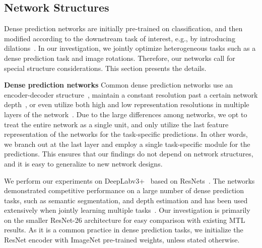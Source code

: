 \documentclass[10pt,twocolumn,letterpaper]{article}
\newcommand{\parsection}[1]{\vspace{1mm}\noindent\textbf{#1 }}
\begin{document}
\subsection{Network Structures}
\label{architecture}

Dense prediction networks are initially pre-trained on classification, and then modified according to the downstream task of interest, e.g., by introducing dilations~\cite{yu2015multi}. 
In our investigation, we jointly optimize heterogeneous tasks such as a dense prediction task and image rotations. 
Therefore, our networks call for special structure considerations. 
This section presents the details.

\parsection{Dense prediction networks}
Common dense prediction networks use an encoder-decoder structure~\cite{ronneberger2015u,badrinarayanan2017segnet}, maintain a constant resolution past a certain network depth~\cite{yu2017dilated}, or even utilize both high and low representation resolutions in multiple layers of the network~\cite{wang2020deep}. 
Due to the large differences among networks, we opt to treat the entire network as a single unit, and only utilize the last feature representation of the networks for the task-specific predictions. 
In other words, we branch out at the last layer and employ a single task-specific module for the predictions.
This ensures that our findings do not depend on network structures, and it is easy to generalize to new network designs.

We perform our experiments on DeepLabv3+~\cite{chen2018encoder} based on ResNets~\cite{he2016deep}. The networks demonstrated competitive performance on a large number of dense prediction tasks, such as semantic segmentation, and depth estimation and has been used extensively when jointly learning multiple tasks~\cite{maninis2019attentive,bruggemann2020automated}. 
Our investigation is primarily on the smaller ResNet-26 architecture for easy comparison with existing MTL results.
As it is a common practice in dense prediction tasks, we initialize the ResNet encoder with ImageNet pre-trained weights, unless stated otherwise.
\end{document}
